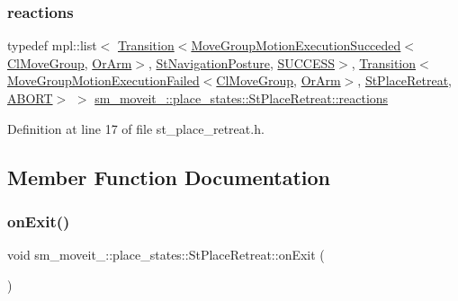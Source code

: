 \subsubsection{\texorpdfstring{reactions}{reactions}}
{\footnotesize\ttfamily typedef mpl\+::list$<$ \hyperlink{classsmacc_1_1Transition}{Transition}$<$\hyperlink{structmoveit__z__client_1_1MoveGroupMotionExecutionSucceded}{Move\+Group\+Motion\+Execution\+Succeded}$<$\hyperlink{classmoveit__z__client_1_1ClMoveGroup}{Cl\+Move\+Group}, \hyperlink{classsm__moveit__4_1_1OrArm}{Or\+Arm}$>$, \hyperlink{structsm__moveit__4_1_1place__states_1_1StNavigationPosture}{St\+Navigation\+Posture}, \hyperlink{structsmacc_1_1default__transition__tags_1_1SUCCESS}{S\+U\+C\+C\+E\+SS}$>$, \hyperlink{classsmacc_1_1Transition}{Transition}$<$\hyperlink{structmoveit__z__client_1_1MoveGroupMotionExecutionFailed}{Move\+Group\+Motion\+Execution\+Failed}$<$\hyperlink{classmoveit__z__client_1_1ClMoveGroup}{Cl\+Move\+Group}, \hyperlink{classsm__moveit__4_1_1OrArm}{Or\+Arm}$>$, \hyperlink{structsm__moveit__4_1_1place__states_1_1StPlaceRetreat}{St\+Place\+Retreat}, \hyperlink{structsmacc_1_1default__transition__tags_1_1ABORT}{A\+B\+O\+RT}$>$ $>$ \hyperlink{structsm__moveit__4_1_1place__states_1_1StPlaceRetreat_a137af34354b6135e95217e02aefcc456}{sm\+\_\+moveit\+\_\+::place\+\_\+states\+::\+St\+Place\+Retreat\+::reactions}}



Definition at line 17 of file st\+\_\+place\+\_\+retreat.\+h.



\subsection{Member Function Documentation}
\mbox{\label{structsm__moveit__4_1_1place__states_1_1StPlaceRetreat_a700f6a70e4c9836fef4b4b3e9546500d}} 
\subsubsection{\texorpdfstring{on\+Exit()}{onExit()}}
{\footnotesize\ttfamily void sm\+\_\+moveit\+\_\+::place\+\_\+states\+::\+St\+Place\+Retreat\+::on\+Exit (\begin{DoxyParamCaption}{ }\end{DoxyParamCaption})\hspace{0.3cm}{\ttfamily [inline]}}



